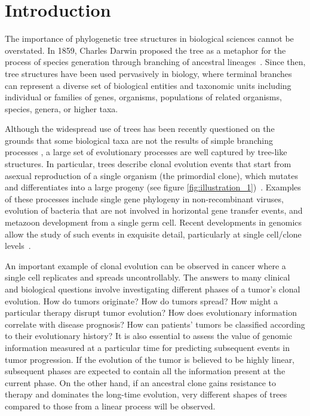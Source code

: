 \documentclass[a4paper,11pt]{article}
\begin{document}

\section{Introduction}

The importance of phylogenetic tree structures in biological sciences cannot be overstated.
In 1859, Charles Darwin proposed the tree as a metaphor for the
process of species generation through branching of ancestral
lineages~\cite{darwin1859origin}.  Since then, tree structures have
been used pervasively in biology, where terminal branches can
represent a diverse set of biological entities and taxonomic units
including individual or families of genes, organisms, populations of
related organisms, species, genera, or higher taxa.

Although the widespread use of trees has been recently questioned on the grounds that some biological taxa are not the results of simple branching processes \cite{doolittle1999phylogenetic, chan2013topology}, a large set of evolutionary processes are well captured by tree-like structures.
In particular, trees describe clonal evolution events that start from asexual reproduction of a single organism (the primordial clone), which mutates and differentiates into a large progeny (see figure \ref{fig:illustration_1})~\cite{khiabanian2014viral}.
Examples of these processes include single gene phylogeny in
non-recombinant viruses, evolution of bacteria that are not involved
in horizontal gene transfer events, and metazoon development from a
single germ cell.
Recent developments in genomics allow the study of
such events in exquisite detail, particularly at single cell/clone
levels~\cite{navin2011tumour, shalek2013single, eirew2014dynamics}.

An important example of clonal evolution can be observed in cancer where a single cell replicates and spreads uncontrollably.
The answers to many clinical and biological questions involve investigating different phases of a tumor's clonal evolution.
How do tumors originate?
How do tumors spread?
How might a particular therapy disrupt tumor evolution?
How does evolutionary information correlate with disease prognosis?
How can patients' tumors be classified according to their evolutionary history?
It is also essential to assess the value of genomic information measured at a particular time for predicting subsequent events in tumor progression.
If the evolution of the tumor is believed to be highly linear, subsequent phases are expected to contain all the information present at the current phase.
On the other hand, if an ancestral clone gains resistance to therapy and dominates the long-time evolution, very different shapes of trees compared to those from a linear process will be observed.
\end{document}
